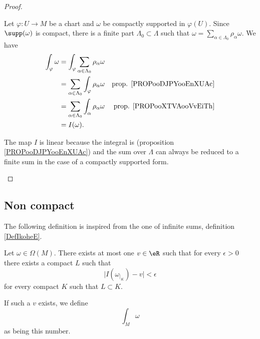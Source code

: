 \begin{proof}
\begin{subproof}
		Let \(\varphi \colon U\to M  \) be a chart and \( \omega\) be compactly supported in \( \varphi(U)\). Since \( \supp(\omega)\) is compact, there is a finite part \( \Lambda_0\subset \Lambda\) such that \( \omega=\sum_{\alpha\in\Lambda_0}\rho_{\alpha}\omega\). We have
		\begin{subequations}
			\begin{align}
				\int_{\varphi}\omega & =\int_{\varphi}\sum_{\alpha\in \Lambda_0}\rho_{\alpha}\omega                                         \\
				                     & =\sum_{\alpha\in\Lambda_0}\int_{\varphi}\rho_{\alpha}\omega  & \text{prop. \ref{PROPooDJPYooEnXUAc}} \\
				                     & = \sum_{\alpha\in\Lambda_0}\int_{\alpha}\rho_{\alpha}\omega  & \text{prop. \ref{PROPooXTVAooVvEiTh}} \\
				                     & = I(\omega).
			\end{align}
		\end{subequations}

		The map \( I\) is linear because the integral is (proposition \ref{PROPooDJPYooEnXUAc}) and the sum over \( \Lambda\) can always be reduced to a finite sum in the case of a compactly supported form.
	\end{subproof}
\end{proof}


\subsection{Non compact}

The following definition is inspired from the one of infinite sums, definition \ref{DefIkoheE}.
\begin{propositionDef}	\label{PROPooLCYGooLUxEYS}
	Let \( \omega\in\Omega(M)\). There exists at most one \( v\in \eR\) such that for every \( \epsilon>0\) there exists a compact \( L\) such that
	\begin{equation}
		\big| I(\omega_{|_K})-v \big|<\epsilon
	\end{equation}
	for every compact \( K\) such that \( L\subset K\).

	If such a \( v\) exists, we define
	\begin{equation}
		\int_M\omega
	\end{equation}
	as being this number.
\end{propositionDef}


